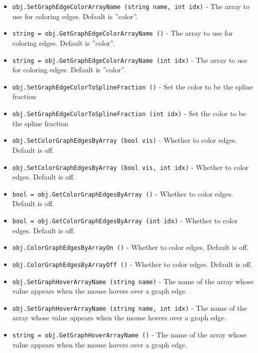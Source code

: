 \begin{itemize}
\item  \verb|obj.SetGraphEdgeColorArrayName (string name, int idx)| -  The array to use for coloring edges.  Default is ''color''.

\item  \verb|string = obj.GetGraphEdgeColorArrayName ()| -  The array to use for coloring edges.  Default is ''color''.

\item  \verb|string = obj.GetGraphEdgeColorArrayName (int idx)| -  The array to use for coloring edges.  Default is ''color''.

\item  \verb|obj.SetGraphEdgeColorToSplineFraction ()| -  Set the color to be the spline fraction

\item  \verb|obj.SetGraphEdgeColorToSplineFraction (int idx)| -  Set the color to be the spline fraction

\item  \verb|obj.SetColorGraphEdgesByArray (bool vis)| -  Whether to color edges.  Default is off.

\item  \verb|obj.SetColorGraphEdgesByArray (bool vis, int idx)| -  Whether to color edges.  Default is off.

\item  \verb|bool = obj.GetColorGraphEdgesByArray ()| -  Whether to color edges.  Default is off.

\item  \verb|bool = obj.GetColorGraphEdgesByArray (int idx)| -  Whether to color edges.  Default is off.

\item  \verb|obj.ColorGraphEdgesByArrayOn ()| -  Whether to color edges.  Default is off.

\item  \verb|obj.ColorGraphEdgesByArrayOff ()| -  Whether to color edges.  Default is off.

\item  \verb|obj.SetGraphHoverArrayName (string name)| -  The name of the array whose value appears when the mouse hovers
 over a graph edge.

\item  \verb|obj.SetGraphHoverArrayName (string name, int idx)| -  The name of the array whose value appears when the mouse hovers
 over a graph edge.

\item  \verb|string = obj.GetGraphHoverArrayName ()| -  The name of the array whose value appears when the mouse hovers
 over a graph edge.


\end{itemize}
